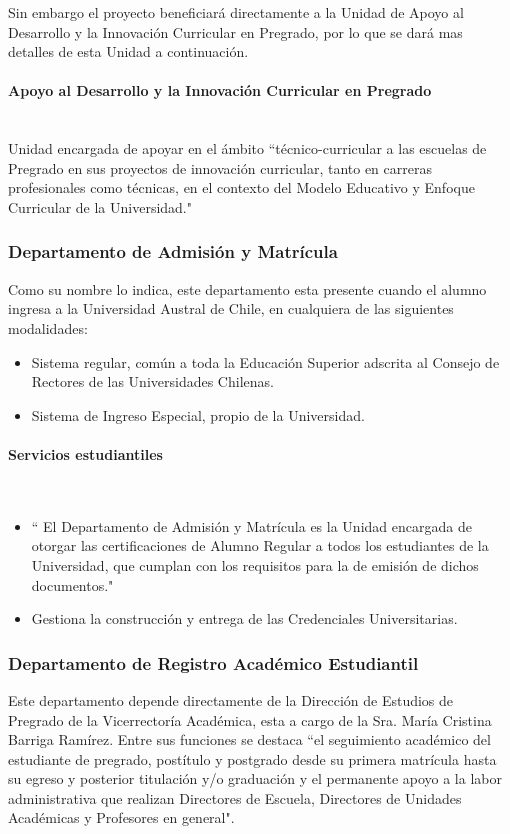 \documentclass[12pt]{article}
\newcommand{\myparagraph}[1]{\paragraph{#1}\mbox{}\\}
\begin{document}
		Sin embargo el proyecto beneficiará directamente  a la Unidad de Apoyo al Desarrollo y la Innovación Curricular en Pregrado, por lo que se dará mas detalles de esta Unidad a continuación.
		
		
		\myparagraph{Apoyo al Desarrollo y la Innovación Curricular en Pregrado}
		
		Unidad encargada de apoyar en el ámbito ``técnico-curricular a las escuelas de Pregrado en sus proyectos de innovación curricular, tanto en carreras profesionales como técnicas, en el contexto del Modelo Educativo y Enfoque Curricular de la Universidad."\cite{Dac15}
		\subsubsection{Departamento de Admisión y Matrícula}
		
			Como su nombre lo indica, este departamento esta presente cuando el alumno ingresa a la Universidad Austral de Chile, en cualquiera de las siguientes modalidades:
			\begin{itemize}
				\item Sistema regular, común a toda la Educación Superior adscrita al Consejo de Rectores de las Universidades Chilenas.
				\item Sistema de Ingreso Especial, propio de la Universidad.
			\end{itemize}
			
			\myparagraph{Servicios estudiantiles} 
			
			\begin{itemize}
				\item 	`` El Departamento de Admisión y Matrícula es la Unidad encargada de otorgar las certificaciones de Alumno Regular a todos los estudiantes de la Universidad, que cumplan con los requisitos para la de emisión de dichos documentos."\cite{Dep15}
				\item Gestiona  la construcción y entrega de las Credenciales Universitarias.
			\end{itemize}
		
			
			
			
		\subsubsection{Departamento de Registro Académico Estudiantil}
	
			Este departamento depende directamente de la Dirección de Estudios de Pregrado de la Vicerrectoría Académica, esta a cargo de la Sra. María Cristina Barriga Ramírez. Entre sus funciones se destaca ``el seguimiento académico del estudiante de pregrado, postítulo y postgrado desde su primera matrícula hasta su egreso y posterior titulación y/o graduación y el permanente apoyo a la labor administrativa que realizan Directores de Escuela, Directores de Unidades Académicas y Profesores en general"\cite{Dir15}.
			
\end{document}

